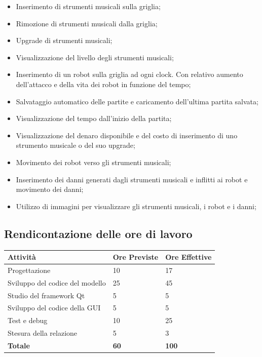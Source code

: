 \documentclass[11pt]{article}
\begin{document}
\begin{itemize}
	\item Inserimento di strumenti musicali sulla griglia;

	\item Rimozione di strumenti musicali dalla griglia;

	\item Upgrade di strumenti musicali;

	\item Visualizzazione del livello degli strumenti musicali;

	\item Inserimento di un robot sulla griglia ad ogni clock. Con relativo
		aumento dell'attacco e della vita dei robot in funzione del tempo;

	\item Salvataggio automatico delle partite e caricamento dell'ultima
		partita salvata;

	\item Visualizzazione del tempo dall'inizio della partita;

	\item Visualizzazione del denaro disponibile e del costo di inserimento di
		uno strumento musicale o del suo upgrade;

	\item Movimento dei robot verso gli strumenti musicali;

	\item Inserimento dei danni generati dagli strumenti musicali e inflitti ai
		robot e movimento dei danni;

	\item Utilizzo di immagini per visualizzare gli strumenti musicali, i robot
		e i danni;
\end{itemize}

\subsection{Rendicontazione delle ore di lavoro}

\begin{table}[ht]
	\centering
	\begin{tabular}{|l|l|l|}
		\hline
		\textbf{Attività} & \textbf{Ore Previste} & \textbf{Ore Effettive} \\
		\hline
		Progettazione & 10 & 17 \\
		\hline
		Sviluppo del codice del modello & 25 & 45 \\
		\hline
		Studio del framework Qt & 5 & 5 \\
		\hline
		Sviluppo del codice della GUI & 5 & 5 \\
		\hline
		Test e debug & 10 & 25 \\
		\hline
		Stesura della relazione & 5 & 3 \\
		\hline
		\textbf{Totale} & \textbf{60} & \textbf{100} \\
		\hline
	\end{tabular}
\end{table}
\end{document}
